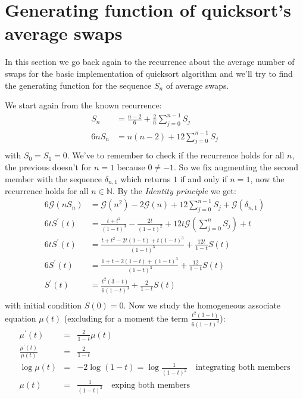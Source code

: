 \section{Generating function of quicksort's average swaps }

In this section we go back again to the recurrence about the average
number of swaps for the basic implementation of quicksort algorithm
and we'll try to find the generating function for the sequence $S_n$
of average swaps.

We start again from the known recurrence:
\begin{displaymath}
  \begin{split}
    S_n &= \frac{n-2}{6} + \frac{2}{n}\sum_{j=0}^{n-1}{S_j}\\
    6nS_n &= n(n-2) + 12\sum_{j=0}^{n-1}{S_j}\\
  \end{split}
\end{displaymath}
with $S_0 = S_1 = 0$. We've to remember to check if the recurrence
holds for all $n$, the previous doesn't for $n=1$ because $0 \not=
-1$. So we fix augmenting the second member with the sequence
$\delta_{n,1}$ which returns $1$ if and only if $n=1$, now the
recurrence holds for all $n \in \mathbb{N} $. By the \emph{Identity
  principle} we get:
\begin{displaymath}
  \begin{split}
    6 \mathcal{G} (nS_n) &= \mathcal{G} (n^2) -2 \mathcal{G} (n) + 12
    \sum_{j=0}^{n-1}{S_j} + \mathcal{G} (\delta_{n,1}) \\
    6t S^{\prime} (t) &= \frac{t + t^2}{(1-t)^3} - \frac{2t}{(1-t)^2}
    + 12 t \mathcal{G} \left(\sum_{j=0}^{n}{S_j}\right) + t\\
    6t S^{\prime} (t) &= \frac{t + t^2 -2t(1-t) + t(1-t)^3}{(1-t)^3} +
    \frac{12 t}{1-t} S(t)\\
    6 S^{\prime} (t) &= \frac{1 + t -2(1-t) + (1-t)^3}{(1-t)^3} +
    \frac{12}{1-t} S(t)\\
    S^{\prime} (t) &= \frac{t^2(3-t)}{6(1-t)^3} +
    \frac{2}{1-t} S(t)\\
  \end{split}
\end{displaymath}
with initial condition $S(0) = 0$. Now we study the homogeneous
associate equation $\mu(t)$ (excluding for a moment the term $
\frac{t^2(3-t)}{6(1-t)^3}$):
\begin{eqnarray}
  \mu^{\prime} (t) &=&  \frac{2}{1-t} \mu (t)\\
  \frac{\mu^{\prime}(t)}{\mu (t)} &=& \frac{2}{1-t} \label{eq:assoc-swaps-qs}\\
  \log\mu (t) &=& -2\log (1-t) = \log \frac{1}{(1-t)^2} \quad \text{
    integrating both members} \\
  \label{eq:final-assoc-swaps-qs}
  \mu (t) &=& \frac{1}{(1-t)^2}\quad \text{
    exping both members}
\end{eqnarray}
